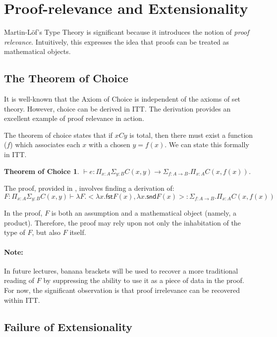 \documentclass[12pt]{article}
\newtheorem*{toc}{Theorem of Choice}
\begin{document}
\section{Proof-relevance and Extensionality}\label{sec:extensionality}

Martin-L\"{o}f's Type Theory is significant because it introduces the notion of
\emph{proof relevance}.  Intuitively, this expresses the idea that proofs can be
treated as mathematical objects.

\subsection{The Theorem of Choice}

It is well-known that the Axiom of Choice is independent of the axioms of 
set theory.  However, choice can be derived in ITT.  The derivation provides an 
excellent example of proof relevance in action.

The theorem of choice
states that if $x C y$ is total, then there must exist a function ($f$) which
associates each $x$ with a chosen $y = f(x)$.  We can state this formally
in ITT.

\begin{toc}
$\vdash e : \Pi_{x:A} \Sigma_{y:B} C(x,y) \rightarrow
  \Sigma_{f : A \rightarrow B} . \Pi_{x:A} C(x, f(x))$.
\end{toc}

The proof, provided in \cite{MartinLof80}, involves finding a derivation of:
\begin{equation*}
F :  \Pi_{x:A} \Sigma_{y:B} C(x,y) \vdash \lambda F . <\lambda x . \mathsf{fst} F(x) , \lambda x . \mathsf{snd} F(x)> : \Sigma_{f : A \rightarrow B} . \Pi_{x:A} C(x, f(x))
\end{equation*}

In the proof, $F$ is both an assumption and a mathematical object (namely, a product).
Therefore, the proof may rely upon not only the inhabitation of the type of $F$, but
also $F$ itself.

\paragraph{Note:} In future lectures, banana brackets will be used to recover
a more traditional reading of $F$ by suppressing the ability to use it as a piece
of data in the proof.  For now, the significant observation is that proof
irrelevance can be recovered within ITT.

\subsection{Failure of Extensionality}
\end{document}

